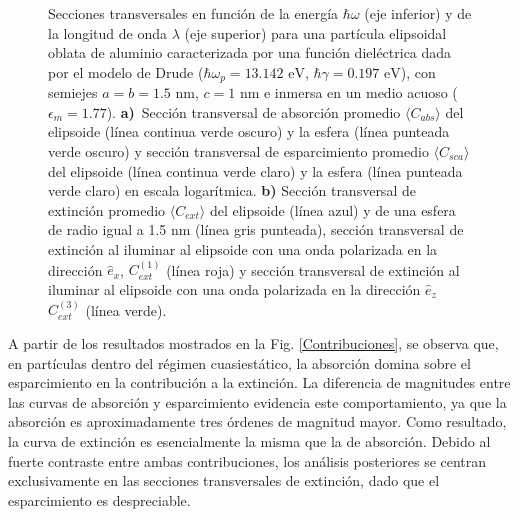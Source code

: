 \begin{figure}[h!]
	\quad%
	\caption{Secciones transversales en función de la energía $\hbar\omega$ (eje inferior) y de la longitud de onda $\lambda$ (eje superior) para una partícula elipsoidal oblata de aluminio caracterizada por una función dieléctrica dada por el modelo de Drude ($\hbar\omega_p=13.142\text{ eV}$, $\hbar\gamma=0.197\text{ eV}$), con semiejes $a=b=1.5\text{ nm}$, $c=1\text{ nm}$ e inmersa en un medio acuoso ($\epsilon_m=1.77$). \textbf{a)}~Sección transversal de absorción promedio $\langle C_{abs}\rangle$  del elipsoide (línea continua verde oscuro) y la esfera (línea punteada verde oscuro) y sección transversal de esparcimiento promedio $\langle C_{sca}\rangle$  del elipsoide (línea continua verde claro) y la esfera (línea punteada verde claro) en escala logarítmica. \textbf{b)} Sección transversal de extinción promedio $\langle C_{ext}\rangle$ del elipsoide (línea azul) y de una esfera de radio igual a 1.5 nm (línea gris punteada), sección transversal de extinción al iluminar al elipsoide con una onda polarizada en la dirección $\hat{e}_x$, $C_{ext}^{(1)}$  (línea roja)  y sección transversal de extinción al iluminar al elipsoide con una onda polarizada en la dirección $\hat{e}_z$ $C_{ext}^{(3)}$  (línea verde).} \label{fig:test}
\end{figure}

A partir de los resultados mostrados en la Fig. \ref{Contribuciones}, se observa que, en partículas dentro del régimen cuasiestático, la absorción domina sobre el esparcimiento en la contribución a la extinción.  La diferencia de magnitudes entre las curvas de absorción y esparcimiento evidencia este comportamiento, ya que la absorción es aproximadamente tres órdenes de magnitud mayor. Como resultado, la curva de extinción es esencialmente la misma que la de absorción. Debido al fuerte contraste entre ambas contribuciones, los análisis posteriores se centran exclusivamente en las secciones transversales de extinción, dado que el esparcimiento es despreciable.\\


